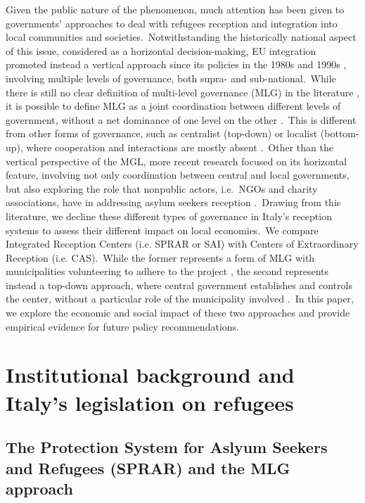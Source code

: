 \documentclass[authoryear,preprint,review,12pt]{elsarticle}
\begin{document}
\noindent
Given the public nature of the phenomenon, much attention has been given to governments' approaches to deal with refugees reception and integration into local communities and societies.\ Notwithstanding the historically national aspect of this issue, considered as a horizontal decision-making, EU integration promoted instead a vertical approach since its policies in the 1980s and 1990s \citep{guiradon2000}, involving multiple levels of governance, both supra- and sub-national.\ While there is still no clear definition of multi-level governance (MLG) in the literature \citep{caponio2018}, it is possible to define MLG as a joint coordination between different levels of government, without a net dominance of one level on the other \citep{scholten2016}.\ This is different from other forms of governance, such as centralist (top-down) or localist (bottom-up), where cooperation and interactions are mostly absent \citep{scholten2018}.\ Other than the vertical perspective of the MGL, more recent research focused on its horizontal feature, involving not only coordination between central and local governments, but also exploring the role that nonpublic actors, i.e.\ NGOs and charity associations, have in addressing asylum seekers reception \citep{ambrosini2021}.\ Drawing from this literature, we decline these different types of governance in Italy's reception systems to assess their different impact on local economies.\ We compare Integrated Reception Centers (i.e. SPRAR or SAI) with Centers of Extraordinary Reception (i.e. CAS).\ While the former represents a form of MLG with municipalities volunteering to adhere to the project \citep{campomori2020}, the second represents instead a top-down approach, where central government establishes and controls the center, without a particular role of the municipality involved \citep{marchetti2014}.\ In this paper, we explore the economic and social impact of these two approaches and provide empirical evidence for future policy recommendations.\\


\vspace{5pt}

\section*{Institutional background and Italy's legislation on refugees}

\subsection{The Protection System for Aslyum Seekers and Refugees (SPRAR) and the MLG approach}
\end{document}
